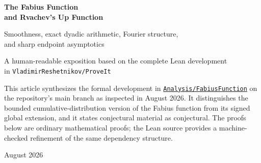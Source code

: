 \documentclass[11pt,oneside]{article}
\theoremstyle{definition}
\theoremstyle{remark}
\begin{document}
\hypersetup{pageanchor=false}
\begin{titlepage}
\centering
\vspace*{1.0in}
{\Huge\bfseries\color{FabiusBlue} The Fabius Function\\[0.18in]
and Rvachev's Up Function\par}
\vspace{0.35in}
{\Large Smoothness, exact dyadic arithmetic, Fourier structure,\\
and sharp endpoint asymptotics\par}
\vspace{0.7in}
{\large A human-readable exposition based on the complete Lean development\\
in \texttt{VladimirReshetnikov/ProveIt}\par}
\vfill
\begin{minipage}{0.84\textwidth}
\small
This article synthesizes the formal development in
\href{https://github.com/VladimirReshetnikov/ProveIt/tree/main/Analysis/FabiusFunction}
{\texttt{Analysis/FabiusFunction}} on the repository's main branch as inspected in
August 2026.  It distinguishes the bounded cumulative-distribution version of the
Fabius function from its signed global extension, and it states conjectural material
as conjectural.  The proofs below are ordinary mathematical proofs; the Lean source
provides a machine-checked refinement of the same dependency structure.
\end{minipage}
\vfill
{\large August 2026\par}
\end{titlepage}
\hypersetup{pageanchor=true}
\end{document}

